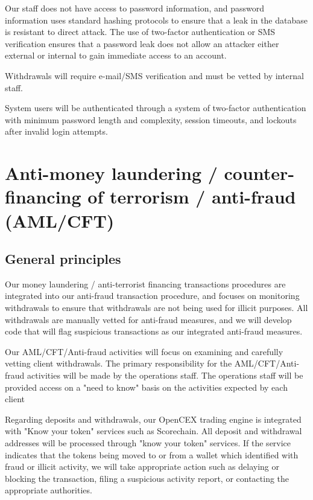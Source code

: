 Our staff does not have access to password information, and password
information uses standard hashing protocols to ensure that a leak in
the database is resistant to direct attack.  The use of two-factor
authentication or SMS verification ensures that a password leak does
not allow an attacker either external or internal to gain immediate
access to an account.

Withdrawals will require e-mail/SMS verification and must be vetted by
internal staff.

System users will be authenticated through a system of two-factor
authentication with minimum password length and complexity, session
timeouts, and lockouts after invalid login attempts.

\section{Anti-money laundering / counter-financing of terrorism /
  anti-fraud (AML/CFT)}

\subsection{General principles}

Our money laundering / anti-terrorist financing transactions
procedures are integrated into our anti-fraud transaction procedure,
and focuses on monitoring withdrawals to ensure that withdrawals are
not being used for illicit purposes.  All withdrawals are manually
vetted for anti-fraud measures, and we will develop code that will
flag suspicious transactions as our integrated anti-fraud measures.

Our AML/CFT/Anti-fraud activities will focus on examining and
carefully vetting client withdrawals.  The primary responsibility for
the AML/CFT/Anti-fraud activities will be made by the operations
staff.  The operations staff will be provided access on a "need to
know" basis on the activities expected by each client

Regarding deposits and withdrawals, our OpenCEX trading engine
is integrated with "Know your token" services such as Scorechain.
All deposit and withdrawal addresses will be processed through "know
your token" services.  If the service indicates that
the tokens being moved to or from a wallet which identified with fraud
or illicit activity, we will take appropriate action such as
delaying or blocking the transaction, filing a suspicious activity
report, or contacting the appropriate authorities.

